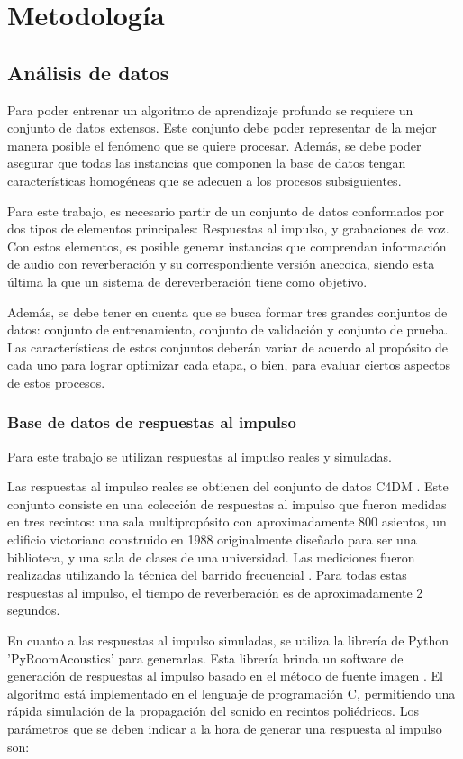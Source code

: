 \section{Metodología}
\subsection{Análisis de datos}
Para poder entrenar un algoritmo de aprendizaje profundo se requiere un conjunto de datos extensos. Este conjunto debe poder representar de la mejor manera posible el fenómeno que se quiere procesar. Además, se debe poder asegurar que todas las instancias que componen la base de datos tengan características homogéneas que se adecuen a los procesos subsiguientes. 

Para este trabajo, es necesario partir de un conjunto de datos conformados por dos tipos de elementos principales: Respuestas al impulso, y grabaciones de voz. Con estos elementos, es posible generar instancias que comprendan información de audio con reverberación y su correspondiente versión anecoica, siendo esta última la que un sistema de dereverberación tiene como objetivo.

Además, se debe tener en cuenta que se busca formar tres grandes conjuntos de datos: conjunto de entrenamiento, conjunto de validación y conjunto de prueba. Las características de estos conjuntos deberán variar de acuerdo al propósito de cada uno para lograr optimizar cada etapa, o bien, para evaluar ciertos aspectos de estos procesos.    


\subsubsection{Base de datos de respuestas al impulso}

Para este trabajo se utilizan respuestas al impulso reales y simuladas. 

Las respuestas al impulso reales se obtienen del conjunto de datos C4DM \cite{rir_reales}. Este conjunto consiste en una colección de respuestas al impulso que fueron medidas en tres recintos: una sala multipropósito con aproximadamente 800 asientos, un edificio victoriano construido en 1988 originalmente diseñado para ser una biblioteca, y una sala de clases de una universidad. Las mediciones fueron realizadas utilizando la técnica del barrido frecuencial \cite{sinesweep}. Para todas estas respuestas al impulso, el tiempo de reverberación es de aproximadamente 2 segundos. 

En cuanto a las respuestas al impulso simuladas, se utiliza la librería de Python 'PyRoomAcoustics' \cite{pyroom} para generarlas. Esta librería brinda un software de generación de respuestas al impulso basado en el método de fuente imagen  \cite{ISM}. El algoritmo está implementado en el lenguaje de programación C, permitiendo una rápida simulación de la propagación del sonido en recintos poliédricos. Los parámetros que se deben indicar a la hora de generar una respuesta al impulso son: 


